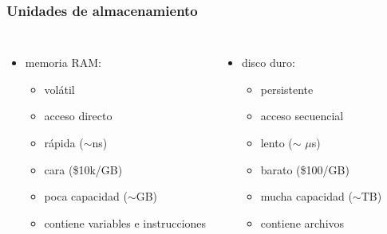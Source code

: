 \documentclass[12pt]{beamer}
\begin{document}
  \begin{frame}
    \frametitle{Unidades de almacenamiento}
    \begin{columns}[t]
        \begin{itemize}
          \item memoria RAM:
            \begin{itemize}
              \item volátil
              \item acceso directo
              \item rápida {\tiny($\sim$ns)}
              \item cara {\tiny(\$10k/GB)}
              \item poca capacidad {\tiny($\sim$GB)}
              \item contiene variables e instrucciones
            \end{itemize}
        \end{itemize}
        \begin{itemize}
          \item disco duro:
            \begin{itemize}
              \item persistente
              \item acceso secuencial
              \item lento {\tiny($\sim$ $\mu$s)}
              \item barato {\tiny(\$100/GB)}
              \item mucha capacidad {\tiny($\sim$TB)}
              \item contiene \alert{archivos}
            \end{itemize}
        \end{itemize}
    \end{columns}
  \end{frame}
\end{document}
